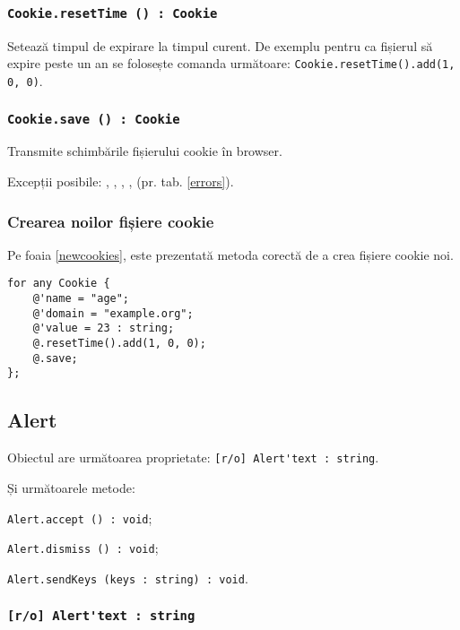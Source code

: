\subsubsection{\lstinline|Cookie.resetTime () : Cookie|}

Setează timpul de expirare la timpul curent. De exemplu pentru ca fișierul să expire peste un an se folosește comanda următoare: \lstinline|Cookie.resetTime().add(1, 0, 0)|.

\subsubsection{\lstinline|Cookie.save () : Cookie|}

Transmite schimbările fișierului cookie în browser.

Excepții posibile: , , , ,  (pr. tab. \ref{errors}).

\subsubsection{Crearea noilor fișiere cookie}

Pe foaia \ref{newcookies}, este prezentată metoda corectă de a crea fișiere cookie noi.

\begin{lstlisting}[caption=Crearea noilor fișiere cookie, label=newcookies]
for any Cookie {
	@'name = "age";
	@'domain = "example.org";
	@'value = 23 : string;
	@.resetTime().add(1, 0, 0);
	@.save;
};
\end{lstlisting}


\subsection{{\color{orange} Alert}}

Obiectul \alert{} are următoarea proprietate: \lstinline|[r/o] Alert'text : string|.

Și următoarele metode:
\begin{icItems}
	\item \lstinline|Alert.accept () : void|;
	\item \lstinline|Alert.dismiss () : void|;
	\item \lstinline|Alert.sendKeys (keys : string) : void|.
\end{icItems}

\subsubsection{\lstinline|[r/o] Alert'text : string|}

